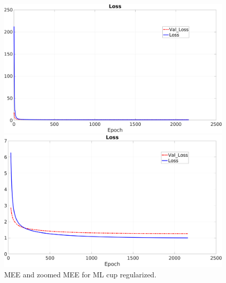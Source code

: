 \begin{figure}[H]
    \centering
    \begin{minipage}[t]{0.5\linewidth}
        \includegraphics[width=\linewidth]{img/Cup_loss_Reg_noZoom.png}
    \end{minipage}%
    \begin{minipage}[t]{0.5\linewidth}
        \includegraphics[width=\linewidth]{img/Cup_loss_Reg_Zoom.png}
    \end{minipage}
    \caption{MEE and zoomed MEE for ML cup regularized.}
\end{figure}



